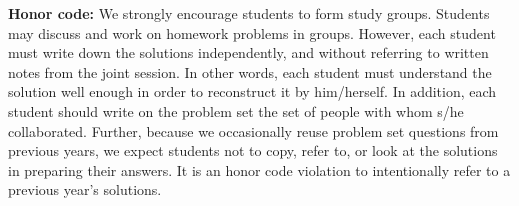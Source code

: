 {\bf Honor code:} We strongly encourage students to form study
groups. Students may discuss and work on homework problems in
groups. However, each student must write down the solutions independently,
and without referring to written notes from the joint session. In other
words, each student must understand the solution well enough in order to
reconstruct it by him/herself. In addition, each student should write on
the problem set the set of people with whom s/he collaborated.
Further, because we occasionally reuse problem set questions from previous
years, we expect students not to copy, refer to, or look at the solutions
in preparing their answers. It is an honor code violation to intentionally
refer to a previous year's solutions. 
